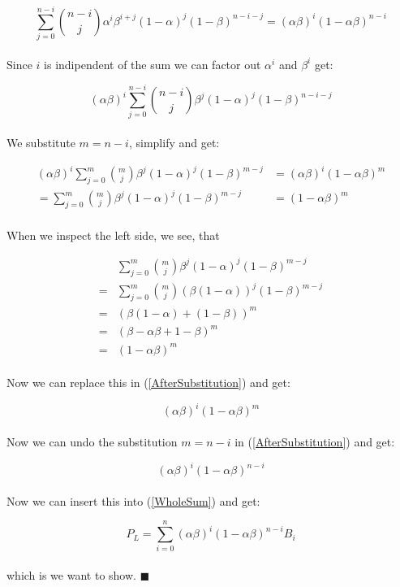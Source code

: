 \begin{equation*}
    \sum_{j=0}^{n-i} \binom{n-i}{j}\alpha^{i}\beta^{i+j}(1-\alpha)^{j}(1-\beta)^{n-i-j} = (\alpha\beta)^{i}(1-\alpha\beta)^{n-i}
\end{equation*}
\\
Since $i$ is indipendent of the sum we can factor out $\alpha^{i}$ and $\beta^{i}$ get:

\begin{equation}\label{BeforSubstitution}
    (\alpha\beta)^{i}\sum _{j=0}^{n-i} \binom{n-i}{j}\beta^{j}(1-\alpha)^{j}(1-\beta)^{n-i-j}
\end{equation}
\\
We substitute $m=n-i$, simplify and get:

\begin{align}\label{AfterSubstitution}
    (\alpha\beta)^{i}\sum _{j=0}^{m} \binom{m}{j}\beta^{j}(1-\alpha)^{j}(1-\beta)^{m-j} & = (\alpha\beta)^{i}(1-\alpha\beta)^{m} \\
    = \sum_{j=0}^{m} \binom{m}{j}\beta^{j}(1-\alpha)^{j}(1-\beta)^{m-j}                 & = (1-\alpha\beta)^{m}
\end{align}
\\
When we inspect the left side, we see, that

\begin{align*}
      & \sum _{j=0}^{m} \binom{m}{j}\beta^{j}(1-\alpha)^{j}(1-\beta)^{m-j} \\
    = & \sum _{j=0}^{m} \binom{m}{j}(\beta(1-\alpha))^{j}(1-\beta)^{m-j}   \\
    = & (\beta(1-\alpha) + (1-\beta))^m                                    \\
    = & (\beta - \alpha\beta + 1 - \beta)^m                                \\
    = & (1 - \alpha\beta)^m
\end{align*}
\\
Now we can replace this in (\ref{AfterSubstitution}) and get:

\begin{equation}
    (\alpha\beta)^{i}(1 - \alpha\beta)^m
\end{equation}
\\
Now we can undo the substitution $m=n-i$ in (\ref{AfterSubstitution}) and get:

\begin{equation*}
    (\alpha\beta)^{i}(1 - \alpha\beta)^{n-i}
\end{equation*}
\\
Now we can insert this into (\ref{WholeSum}) and get:

\begin{equation*}
    P_L = \sum_{i=0}^{n}(\alpha\beta)^{i}(1 - \alpha\beta)^{n-i}B_i
\end{equation*}
\\
which is we want to show. $\blacksquare$